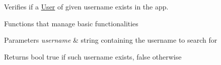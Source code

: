 Verifies if a \hyperlink{class_user}{User} of given username exists in the app. 

Functions that manage basic functionalities 
\begin{DoxyParams}{Parameters}
{\em username} & string containing the username to search for\\
\hline
\end{DoxyParams}
\begin{DoxyReturn}{Returns}
bool true if such username exists, false otherwise 
\end{DoxyReturn}
